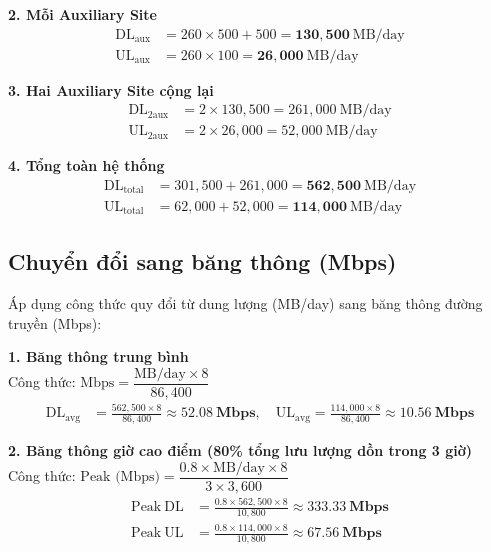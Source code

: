 \vspace{0.2cm}
\noindent \textbf{2. Mỗi Auxiliary Site}
\vspace{-0.4cm}
\begin{align*}
  \mathrm{DL_{aux}} &= 260 \times 500 + 500 = \mathbf{130{,}500}\ \text{MB/day} \\
  \mathrm{UL_{aux}} &= 260 \times 100 = \mathbf{26{,}000}\ \text{MB/day}
\end{align*}

\vspace{0.2cm}
\noindent \textbf{3. Hai Auxiliary Site cộng lại}
\vspace{-0.4cm}
\begin{align*}
  \mathrm{DL_{2aux}} &= 2 \times 130{,}500 = 261{,}000\ \text{MB/day} \\
  \mathrm{UL_{2aux}} &= 2 \times 26{,}000 = 52{,}000\ \text{MB/day}
\end{align*}

\vspace{0.2cm}
\noindent \textbf{4. Tổng toàn hệ thống}
\vspace{-0.4cm}
\begin{align*}
  \mathrm{DL_{total}} &= 301{,}500 + 261{,}000 = \mathbf{562{,}500}\ \text{MB/day} \\
  \mathrm{UL_{total}} &= 62{,}000 + 52{,}000 = \mathbf{114{,}000}\ \text{MB/day}
\end{align*}

\subsection{Chuyển đổi sang băng thông (Mbps)}
Áp dụng công thức quy đổi từ dung lượng (MB/day) sang băng thông đường truyền (Mbps):

\vspace{0.2cm}
\noindent \textbf{1. Băng thông trung bình} \\
Công thức: $\displaystyle\text{Mbps} = \dfrac{\text{MB/day} \times 8}{86{,}400}$
\vspace{-0.4cm}
\begin{align*}
  \mathrm{DL_{avg}} &= \frac{562{,}500 \times 8}{86{,}400} \approx \mathbf{52.08\ \text{Mbps}}, \quad
  \mathrm{UL_{avg}} = \frac{114{,}000 \times 8}{86{,}400} \approx \mathbf{10.56\ \text{Mbps}}
\end{align*}

\vspace{0.2cm}
\noindent \textbf{2. Băng thông giờ cao điểm (80\% tổng lưu lượng dồn trong 3 giờ)} \\
Công thức: $\displaystyle\text{Peak (Mbps)} = \dfrac{0.8 \times \text{MB/day} \times 8}{3 \times 3{,}600}$
\vspace{-0.4cm}
\begin{align*}
  \mathrm{Peak\ DL} &= \frac{0.8 \times 562{,}500 \times 8}{10{,}800} \approx \mathbf{333.33\ \text{Mbps}} \\
  \mathrm{Peak\ UL} &= \frac{0.8 \times 114{,}000 \times 8}{10{,}800} \approx \mathbf{67.56\ \text{Mbps}}
\end{align*}

